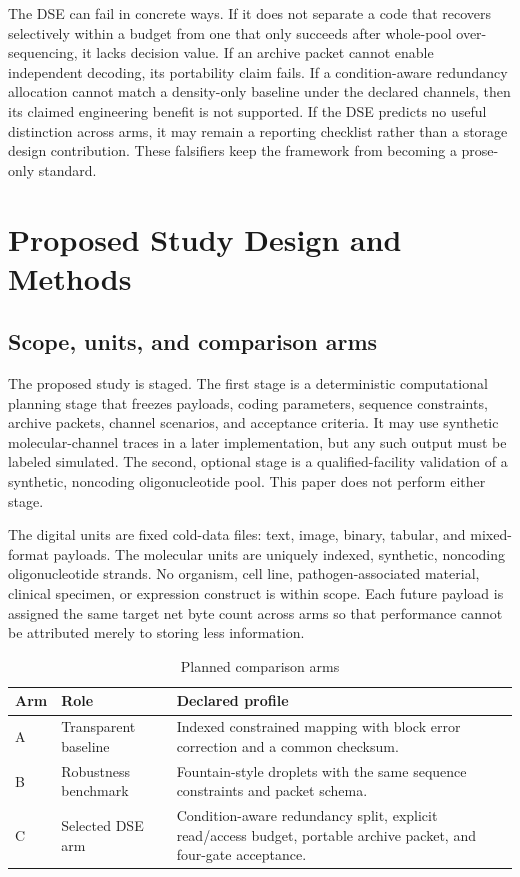\documentclass[conference]{IEEEtran}
\begin{document}
The DSE can fail in concrete ways. If it does not separate a code that recovers selectively within a budget from one that only succeeds after whole-pool over-sequencing, it lacks decision value. If an archive packet cannot enable independent decoding, its portability claim fails. If a condition-aware redundancy allocation cannot match a density-only baseline under the declared channels, then its claimed engineering benefit is not supported. If the DSE predicts no useful distinction across arms, it may remain a reporting checklist rather than a storage design contribution. These falsifiers keep the framework from becoming a prose-only standard.

\section{Proposed Study Design and Methods}

\subsection{Scope, units, and comparison arms}

The proposed study is staged. The first stage is a deterministic computational planning stage that freezes payloads, coding parameters, sequence constraints, archive packets, channel scenarios, and acceptance criteria. It may use synthetic molecular-channel traces in a later implementation, but any such output must be labeled simulated. The second, optional stage is a qualified-facility validation of a synthetic, noncoding oligonucleotide pool. This paper does not perform either stage.

The digital units are fixed cold-data files: text, image, binary, tabular, and mixed-format payloads. The molecular units are uniquely indexed, synthetic, noncoding oligonucleotide strands. No organism, cell line, pathogen-associated material, clinical specimen, or expression construct is within scope. Each future payload is assigned the same target net byte count across arms so that performance cannot be attributed merely to storing less information.

\begin{table}[t]
\caption{Planned comparison arms}
\label{tab:arms}
\centering
\footnotesize
\begin{tabular}{p{}p{}p{}}
\toprule
\textbf{Arm} & \textbf{Role} & \textbf{Declared profile}\\
\midrule
A & Transparent baseline & Indexed constrained mapping with block error correction and a common checksum.\\
B & Robustness benchmark & Fountain-style droplets with the same sequence constraints and packet schema.\\
C & Selected DSE arm & Condition-aware redundancy split, explicit read/access budget, portable archive packet, and four-gate acceptance.\\
\bottomrule
\end{tabular}
\end{table}
\end{document}
